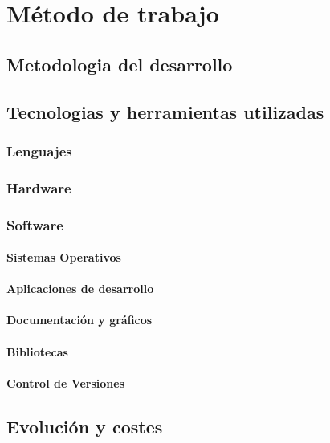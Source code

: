 \chapter{Método de trabajo}
\label{chap:metodo}



\section{Metodologia del desarrollo}

\section{Tecnologias y herramientas utilizadas}

\subsection{Lenguajes}
\subsection{Hardware}
\subsection{Software}

\subsubsection{Sistemas Operativos}

\subsubsection{Aplicaciones de desarrollo}
\subsubsection{Documentación y gráficos}
\subsubsection{Bibliotecas}
\subsubsection{Control de Versiones}

\section{Evolución y costes}

